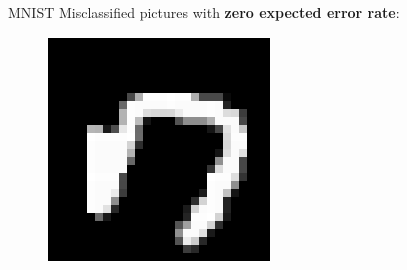\documentclass{beamer}
\begin{document}
\begin{frame}{MNIST}
	Misclassified pictures with \textbf{zero expected error rate}:
	
	\vspace{0.5cm}
	
	\begin{minipage}[t]{0.32\columnwidth}
		\begin{figure}
			\includegraphics[width=1\columnwidth]{pres_pics/high_conf/70}
		\end{figure}
	\end{minipage}
\hfill
	\begin{minipage}[t]{0.32\columnwidth}
\end{minipage}
\end{frame}
\end{document}
